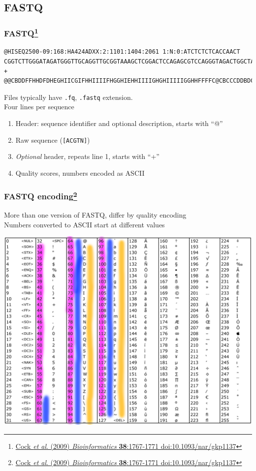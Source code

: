 \subsection{FASTQ}

\begin{frame}[fragile]
  \frametitle{FASTQ\footnote{\tiny{\href{http://dx.doi.org/10.1093/nar/gkp1137}{Cock \textit{et al}. (2009) \textit{Bioinformatics} \textbf{38}:1767-1771 doi:10.1093/nar/gkp1137}}}}
\begin{verbatim}
@HISEQ2500-09:168:HA424ADXX:2:1101:1404:2061 1:N:0:ATCTCTCTCACCAACT
CGGTCTTGGGATAGATGGGTTGCAGGTTGCGGTAAAGCTCGGACTCCAGAGCGTCCAGGGTAGACTGGCTAATCTTCTGCTCTTTATCGATCATTATTTC
+
@@CBDDFFHHDFDHEGHIICGIFHHIIIIFHGGHIEHHIIIIGHGHIIIIIGGHHFFFFC@CBCCCDDBDCDDDDDDDDCCDDDD3@ABDDDDDEEEDE@
\end{verbatim}
  Files typically have \texttt{.fq}, \texttt{.fastq} extension. \\
  Four lines per sequence
  \begin{enumerate}
    \item Header: sequence identifier and optional description, starts with ``@''
    \item Raw sequence (\texttt{[ACGTN]})
    \item \textit{Optional} header, repeats line 1, starts with ``+''
    \item Quality scores, numbers encoded as ASCII
  \end{enumerate}
\end{frame}

\begin{frame}[fragile]
  \frametitle{FASTQ encoding\footnote{\tiny{\href{http://dx.doi.org/10.1093/nar/gkp1137}{Cock \textit{et al}. (2009) \textit{Bioinformatics} \textbf{38}:1767-1771 doi:10.1093/nar/gkp1137}}}}
  More than one version of FASTQ, differ by quality encoding \\
  Numbers converted to ASCII start at different values
    \begin{center}
      \includegraphics[height=0.7\textheight]{images/ascii_table}
    \end{center}  
\end{frame}

